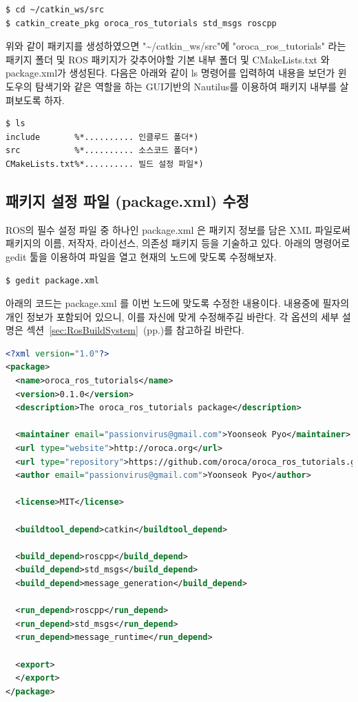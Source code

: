 \begin{lstlisting}[language=ROS]
$ cd ~/catkin_ws/src
$ catkin_create_pkg oroca_ros_tutorials std_msgs roscpp
\end{lstlisting}

위와 같이 패키지를 생성하였으면 "\textasciitilde/catkin\_ws/src"에 "oroca\_ros\_tutorials" 라는 패키지 폴더 및 ROS 패키지가 갖추어야할 기본 내부 폴더 및 CMakeLists.txt 와 package.xml가 생성된다. 다음은 아래와 같이 ls 명령어를 입력하여 내용을 보던가 윈도우의 탐색기와 같은 역할을 하는 GUI기반의 Nautilus를 이용하여 패키지 내부를 살펴보도록 하자.

\begin{lstlisting}[language=ROS]
$ ls
include       %*.......... 인클루드 폴더*)
src           %*.......... 소스코드 폴더*)
CMakeLists.txt%*.......... 빌드 설정 파일*)
\end{lstlisting}

\subsection{패키지 설정 파일 (package.xml) 수정}

ROS의 필수 설정 파일 중 하나인 package.xml 은 패키지 정보를 담은 XML 파일로써 패키지의 이름, 저작자, 라이선스, 의존성 패키지 등을 기술하고 있다. 아래의 명령어로 gedit 툴을 이용하여 파일을 열고 현재의 노드에 맞도록 수정해보자.

\begin{lstlisting}[language=ROS]
$ gedit package.xml 
\end{lstlisting}

아래의 코드는 package.xml 를 이번 노드에 맞도록 수정한 내용이다. 내용중에 필자의 개인 정보가 포함되어 있으니, 이를 자신에 맞게 수정해주길 바란다. 각 옵션의 세부 설명은 섹션~\ref{sec:RosBuildSystem}~(pp.\pageref{sec:RosBuildSystem})를 참고하길 바란다.

\begin{lstlisting}[language=XML]
<?xml version="1.0"?>
<package>
  <name>oroca_ros_tutorials</name>
  <version>0.1.0</version>
  <description>The oroca_ros_tutorials package</description>

  <maintainer email="passionvirus@gmail.com">Yoonseok Pyo</maintainer>
  <url type="website">http://oroca.org</url>
  <url type="repository">https://github.com/oroca/oroca_ros_tutorials.git</url>
  <author email="passionvirus@gmail.com">Yoonseok Pyo</author>

  <license>MIT</license>

  <buildtool_depend>catkin</buildtool_depend>

  <build_depend>roscpp</build_depend>
  <build_depend>std_msgs</build_depend>
  <build_depend>message_generation</build_depend>

  <run_depend>roscpp</run_depend>
  <run_depend>std_msgs</run_depend>
  <run_depend>message_runtime</run_depend>

  <export>
  </export>
</package>
\end{lstlisting}

